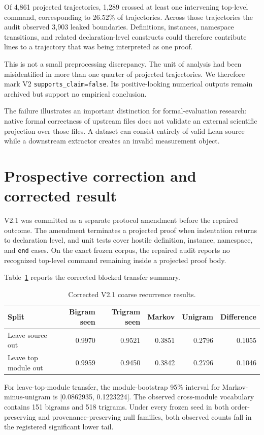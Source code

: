 \documentclass[11pt]{article}
\begin{document}
Of 4,861 projected trajectories, 1,289 crossed at least one intervening top-level command, corresponding to 26.52\% of trajectories. Across those trajectories the audit observed 3,903 leaked boundaries. Definitions, instances, namespace transitions, and related declaration-level constructs could therefore contribute lines to a trajectory that was being interpreted as one proof.

This is not a small preprocessing discrepancy. The unit of analysis had been misidentified in more than one quarter of projected trajectories. We therefore mark V2 \texttt{supports\_claim=false}. Its positive-looking numerical outputs remain archived but support no empirical conclusion.

The failure illustrates an important distinction for formal-evaluation research: native formal correctness of upstream files does not validate an external scientific projection over those files. A dataset can consist entirely of valid Lean source while a downstream extractor creates an invalid measurement object.

\section{Prospective correction and corrected result}
V2.1 was committed as a separate protocol amendment before the repaired outcome. The amendment terminates a projected proof when indentation returns to declaration level, and unit tests cover hostile definition, instance, namespace, and \texttt{end} cases. On the exact frozen corpus, the repaired audit reports no recognized top-level command remaining inside a projected proof body.

Table~\ref{tab:transfer} reports the corrected blocked transfer summary.

\begin{table}[h]
\centering
\caption{Corrected V2.1 coarse recurrence results.}
\label{tab:transfer}
\begin{tabular}{lrrrrr}
\toprule
Split & Bigram seen & Trigram seen & Markov & Unigram & Difference \\
\midrule
Leave source out & 0.9970 & 0.9521 & 0.3851 & 0.2796 & 0.1055 \\
Leave top module out & 0.9959 & 0.9450 & 0.3842 & 0.2796 & 0.1046 \\
\bottomrule
\end{tabular}
\end{table}

For leave-top-module transfer, the module-bootstrap 95\% interval for Markov-minus-unigram is [0.0862935, 0.1223224]. The observed cross-module vocabulary contains 151 bigrams and 518 trigrams. Under every frozen seed in both order-preserving and provenance-preserving null families, both observed counts fall in the registered significant lower tail.
\end{document}
